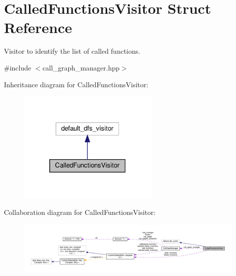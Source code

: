 \hypertarget{structCalledFunctionsVisitor}{}\section{Called\+Functions\+Visitor Struct Reference}
\label{structCalledFunctionsVisitor}


Visitor to identify the list of called functions.  




{\ttfamily \#include $<$call\+\_\+graph\+\_\+manager.\+hpp$>$}



Inheritance diagram for Called\+Functions\+Visitor\+:
\nopagebreak
\begin{figure}[H]
\begin{center}
\leavevmode
\includegraphics[width=195pt]{d7/d83/structCalledFunctionsVisitor__inherit__graph}
\end{center}
\end{figure}


Collaboration diagram for Called\+Functions\+Visitor\+:
\nopagebreak
\begin{figure}[H]
\begin{center}
\leavevmode
\includegraphics[width=350pt]{db/dff/structCalledFunctionsVisitor__coll__graph}
\end{center}
\end{figure}
